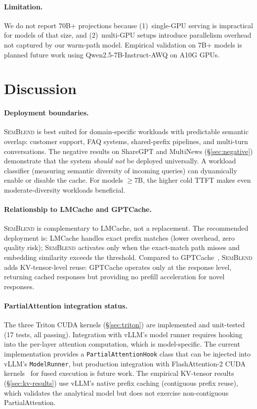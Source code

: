\documentclass[11pt,twocolumn]{article}
\newcommand{\semblend}{\textsc{SemBlend}\xspace}
\begin{document}
\paragraph{Limitation.} We do not report 70B+ projections because
(1)~single-GPU serving is impractical for models of that size, and
(2)~multi-GPU setups introduce parallelism overhead not captured by
our warm-path model. Empirical validation on 7B+ models is planned
future work using Qwen2.5-7B-Instruct-AWQ on A10G GPUs.


\section{Discussion}
\label{sec:discussion}

\paragraph{Deployment boundaries.}
\semblend is best suited for domain-specific workloads with predictable
semantic overlap: customer support, FAQ systems, shared-prefix
pipelines, and multi-turn conversations. The negative results on
ShareGPT and MultiNews (\S\ref{sec:negative}) demonstrate that the
system \emph{should not} be deployed universally. A workload classifier
(measuring semantic diversity of incoming queries) can dynamically
enable or disable the cache. For models $\geq$7B, the
higher cold TTFT makes even moderate-diversity workloads beneficial.

\paragraph{Relationship to LMCache and GPTCache.}
\semblend is complementary to LMCache, not a replacement. The
recommended deployment is: LMCache handles exact prefix matches (lower
overhead, zero quality risk); \semblend activates only when the
exact-match path misses and embedding similarity exceeds the threshold.
Compared to GPTCache~\cite{gptcache}, \semblend adds KV-tensor-level
reuse: GPTCache operates only at the response level, returning cached
responses but providing no prefill acceleration for novel responses.

\paragraph{PartialAttention integration status.}
The three Triton CUDA kernels (\S\ref{sec:triton}) are implemented
and unit-tested (17 tests, all passing). Integration with vLLM's
model runner requires hooking into the per-layer attention computation,
which is model-specific. The current implementation provides
a \texttt{PartialAttentionHook} class that can be injected into vLLM's
\texttt{ModelRunner}, but production integration with FlashAttention-2
CUDA kernels~\cite{flashattention} for fused execution is future work.
The empirical KV-tensor results (\S\ref{sec:kv-results}) use vLLM's
native prefix caching (contiguous prefix reuse), which validates the
analytical model but does not exercise non-contiguous PartialAttention.
\end{document}
